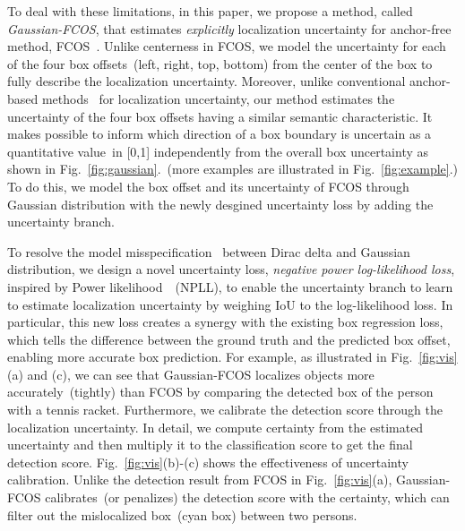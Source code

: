 \documentclass[final]{cvpr}
\begin{document}
To deal with these limitations, in this paper, we propose a method, called \textit{Gaussian-FCOS}, that estimates \textit{explicitly} localization uncertainty for anchor-free method, FCOS~\cite{Tian_2019_ICCV}.
Unlike centerness in FCOS, we model the uncertainty for each of the four box offsets~(left, right, top, bottom) from the center of the box to fully describe the localization uncertainty.
Moreover, unlike conventional anchor-based methods~\cite{kraus2019uncertainty,he2019bounding,le2018uncertainty,harakeh2019bayesod} for localization uncertainty, our method estimates the uncertainty of the four box offsets having a similar semantic characteristic.
It makes possible to inform which direction of a box boundary is uncertain as a quantitative value~in [0,1] independently from the overall box uncertainty as shown in Fig.~\ref{fig:gaussian}.~(more examples are illustrated in Fig.~\ref{fig:example}.)
To do this, we model the box offset and its uncertainty of FCOS through Gaussian distribution with the newly desgined uncertainty loss by adding the uncertainty branch.






To resolve the model misspecification~\cite{holmes2017assigning} between Dirac delta and Gaussian distribution, we design a novel uncertainty loss, \textit{negative power log-likelihood loss}, inspired by Power likelihood~\cite{holmes2017assigning}~(NPLL), to enable the uncertainty branch to learn to estimate localization uncertainty by weighing IoU to the log-likelihood loss.
In particular, this new loss creates a synergy with the existing box regression loss, which tells the difference between the ground truth and the predicted box offset, enabling more accurate box prediction.
For example, as illustrated in Fig.~\ref{fig:vis}(a) and (c), we can see that Gaussian-FCOS localizes objects more accurately~(tightly) than FCOS by comparing the detected box of the person with a tennis racket. 
Furthermore, we calibrate the detection score through the localization uncertainty. 
In detail, we compute certainty from the estimated uncertainty and then multiply it to the classification score to get the final detection score.
Fig.~\ref{fig:vis}(b)-(c) shows the effectiveness of uncertainty calibration.
Unlike the detection result from FCOS in Fig.~\ref{fig:vis}(a), Gaussian-FCOS calibrates~(or penalizes) the detection score with the certainty, which can filter out the mislocalized box~(cyan box) between two persons.
\end{document}
